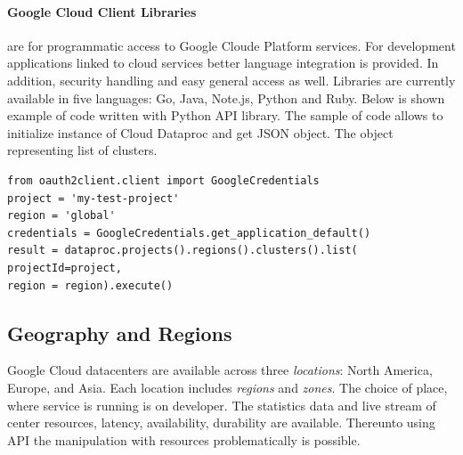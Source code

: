 \documentclass[a4paper,12pt,oneside]{report}
\begin{document}
	\paragraph{Google Cloud Client Libraries} are for programmatic access to Google
	Cloude Platform services. For development applications 
	linked to cloud services better language integration is provided. In addition,
	security handling and easy general access as well. Libraries are currently 
	available in five languages: Go, Java, Note.js, Python and Ruby. Below is shown 
	example of code written with Python API library.  The sample of code allows to
	initialize  
	instance of Cloud Dataproc and get JSON object. The object representing list of
	clusters.
	
	\begin{footnotesize}
		\begin{lstlisting}[style=python]
from oauth2client.client import GoogleCredentials
project = 'my-test-project'
region = 'global'
credentials = GoogleCredentials.get_application_default()
result = dataproc.projects().regions().clusters().list(
projectId=project,
region = region).execute()
		\end{lstlisting}\end{footnotesize}
	
	
	
	\subsection{Geography and Regions}
	Google Cloud datacenters are available across three \textit{locations}: North
	America, Europe, and Asia. Each location includes 
	\textit{regions} and \textit{zones}. The choice of place, where service is
	running is on developer. The statistics data and live stream of 
	center resources, latency, availability, durability are available. Thereunto
	using API the  manipulation with resources problematically is possible. 
	
\end{document}
